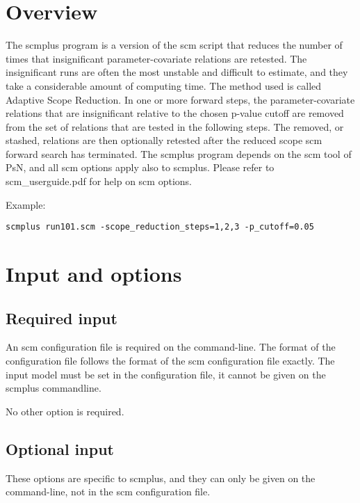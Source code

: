 \documentclass[hideglossary,notoc,hidelof,hidelot,hideTheSignaturePage,hideLinkCurrent,hideloa,pdfLatex,noClient,notitle]{PMXstyle-20170118kajsa4}
\begin{document}
\section{Overview}
The scmplus program is a version of the scm script that reduces the number of times
that insignificant parameter-covariate relations are retested. The insignificant runs are often
the most unstable and difficult to estimate, and they take a considerable amount of computing time.
The method used is called Adaptive Scope Reduction.
In one or more forward steps, the parameter-covariate relations that are insignificant relative to
the chosen p-value cutoff are removed from the set of relations that are tested in the following steps.
The removed, or stashed, relations are then optionally retested after the reduced scope scm forward
search has terminated.
The scmplus program depends on the scm tool of PsN, and all scm options apply also to scmplus.
Please refer to scm\_userguide.pdf for help on scm options.

Example:
\begin{verbatim}
scmplus run101.scm -scope_reduction_steps=1,2,3 -p_cutoff=0.05
\end{verbatim}

\section{Input and options}

\subsection{Required input}
An scm configuration file is required on the command-line. The format of the configuration file follows the format of 
the scm configuration file exactly. 
The input model must be set in the configuration file, it cannot be given on the scmplus commandline. 

No other option is required.

\subsection{Optional input}
These options are specific to scmplus, and they can only be given on the command-line, not in the
scm configuration file.
\end{document}
